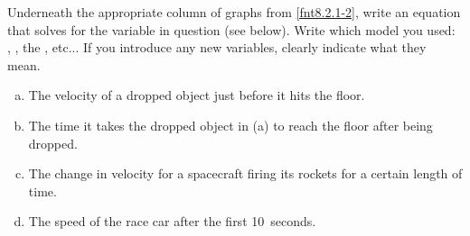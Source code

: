 \label{fnt8.2.1-3}

Underneath the appropriate column of graphs from \ref{fnt8.2.1-2}, write an equation that solves for the variable in question (see below).  Write which model you used: \FModel{}, \EnergyInteractionModel{}, the \pConsModel{}, %
etc... If you introduce any new variables, clearly indicate what they mean.

\begin{enumerate}[(a)]
	\item The velocity of a dropped object just before it hits the floor. 
	\item The time it takes the dropped object in (a) to reach the floor after being dropped.
	\item The change in velocity for a spacecraft firing its rockets for a certain length of time.
	\item The speed of the race car after the first 10~seconds.
\end{enumerate}